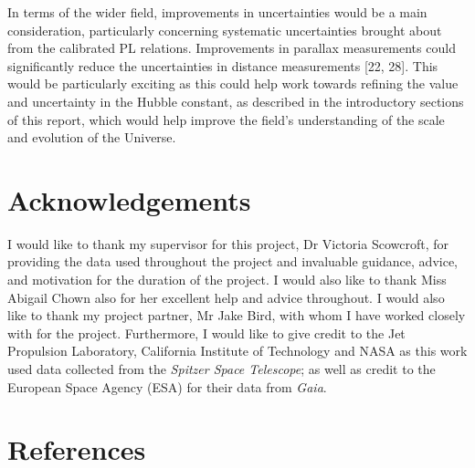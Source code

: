 \documentclass[11pt]{iopart}
\begin{document}
In terms of the wider field, improvements in uncertainties would be a main consideration, particularly concerning systematic uncertainties brought about from the calibrated PL relations. Improvements in parallax measurements could significantly reduce the uncertainties in distance measurements [22, 28]. This would be particularly exciting as this could help work towards refining the value and uncertainty in the Hubble constant, as described in the introductory sections of this report, which would help improve the field’s understanding of the scale and evolution of the Universe.

\section*{Acknowledgements}
I would like to thank my supervisor for this project, Dr Victoria Scowcroft, for providing the data used throughout the project and invaluable guidance, advice, and motivation for the duration of the project. I would also like to thank Miss Abigail Chown also for her excellent help and advice throughout. I would also like to thank my project partner, Mr Jake Bird, with whom I have worked closely with for the project. Furthermore, I would like to give credit to the Jet Propulsion Laboratory, California Institute of Technology and NASA as this work used data collected from the \textit{Spitzer Space Telescope}; as well as credit to the European Space Agency (ESA) for their data from \textit{Gaia}.

\section*{References}
%

%

\end{document}
